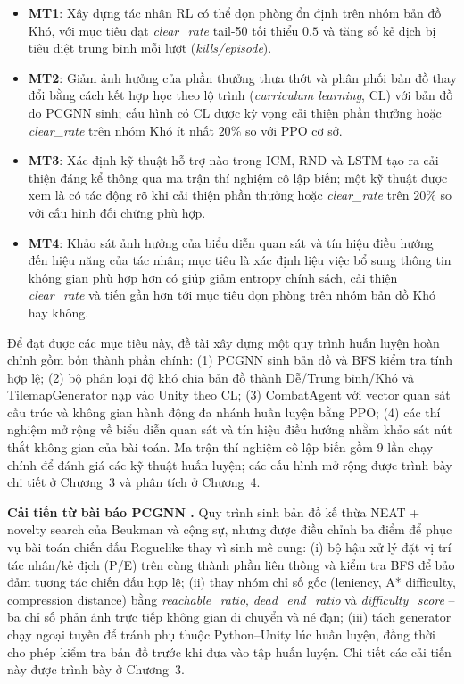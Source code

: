 \renewcommand{\labelitemi}{$-$}
\begin{itemize}
    \item \textbf{MT1}: Xây dựng tác nhân RL có thể dọn phòng ổn định trên nhóm bản đồ Khó, với mục tiêu đạt \textit{clear\_rate} tail-50 tối thiểu $0.5$ và tăng số kẻ địch bị tiêu diệt trung bình mỗi lượt (\textit{kills/episode}).
    \item \textbf{MT2}: Giảm ảnh hưởng của phần thưởng thưa thớt và phân phối bản đồ thay đổi bằng cách kết hợp học theo lộ trình (\emph{curriculum learning}, CL) với bản đồ do PCGNN sinh; cấu hình có CL được kỳ vọng cải thiện phần thưởng hoặc \textit{clear\_rate} trên nhóm Khó ít nhất $20\%$ so với PPO cơ sở.
    \item \textbf{MT3}: Xác định kỹ thuật hỗ trợ nào trong ICM, RND và LSTM tạo ra cải thiện đáng kể thông qua ma trận thí nghiệm cô lập biến; một kỹ thuật được xem là có tác động rõ khi cải thiện phần thưởng hoặc \textit{clear\_rate} trên $20\%$ so với cấu hình đối chứng phù hợp.
    \item \textbf{MT4}: Khảo sát ảnh hưởng của biểu diễn quan sát và tín hiệu điều hướng đến hiệu năng của tác nhân; mục tiêu là xác định liệu việc bổ sung thông tin không gian phù hợp hơn có giúp giảm entropy chính sách, cải thiện \textit{clear\_rate} và tiến gần hơn tới mục tiêu dọn phòng trên nhóm bản đồ Khó hay không.
\end{itemize}

\vspace{0.5cm}

Để đạt được các mục tiêu này, đề tài xây dựng một quy trình huấn luyện hoàn chỉnh gồm bốn thành phần chính: (1) PCGNN sinh bản đồ và BFS kiểm tra tính hợp lệ; (2) bộ phân loại độ khó chia bản đồ thành Dễ/Trung bình/Khó và TilemapGenerator nạp vào Unity theo CL; (3) CombatAgent với vector quan sát cấu trúc và không gian hành động đa nhánh huấn luyện bằng PPO; (4) các thí nghiệm mở rộng về biểu diễn quan sát và tín hiệu điều hướng nhằm khảo sát nút thắt không gian của bài toán. Ma trận thí nghiệm cô lập biến gồm 9 lần chạy chính để đánh giá các kỹ thuật huấn luyện; các cấu hình mở rộng được trình bày chi tiết ở Chương~3 và phân tích ở Chương~4.

\textbf{Cải tiến từ bài báo PCGNN \cite{Beukman2022}.} Quy trình sinh bản đồ kế thừa NEAT + novelty search của Beukman và cộng sự, nhưng được điều chỉnh ba điểm để phục vụ bài toán chiến đấu Roguelike thay vì sinh mê cung: (i) bộ hậu xử lý đặt vị trí tác nhân/kẻ địch (P/E) trên cùng thành phần liên thông và kiểm tra BFS để bảo đảm tương tác chiến đấu hợp lệ; (ii) thay nhóm chỉ số gốc (leniency, A* difficulty, compression distance) bằng \emph{reachable\_ratio}, \emph{dead\_end\_ratio} và \emph{difficulty\_score} -- ba chỉ số phản ánh trực tiếp không gian di chuyển và né đạn; (iii) tách generator chạy ngoại tuyến để tránh phụ thuộc Python--Unity lúc huấn luyện, đồng thời cho phép kiểm tra bản đồ trước khi đưa vào tập huấn luyện. Chi tiết các cải tiến này được trình bày ở Chương~3.

